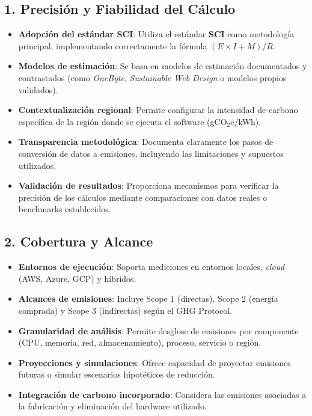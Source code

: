 \documentclass[12pt,a4paper]{report}
\begin{document}
\subsection*{1. Precisión y Fiabilidad del Cálculo}
\begin{itemize}
  \item \textbf{Adopción del estándar SCI}: Utiliza el estándar \textbf{SCI} como metodología principal, implementando correctamente la fórmula $(E \times I + M)/R$.
  \item \textbf{Modelos de estimación}: Se basa en modelos de estimación documentados y contrastados (como \textit{OneByte}, \textit{Sustainable Web Design} o modelos propios validados).
  \item \textbf{Contextualización regional}: Permite configurar la intensidad de carbono específica de la región donde se ejecuta el software (gCO$_2$e/kWh).
  \item \textbf{Transparencia metodológica}: Documenta claramente los pasos de conversión de datos a emisiones, incluyendo las limitaciones y supuestos utilizados.
  \item \textbf{Validación de resultados}: Proporciona mecanismos para verificar la precisión de los cálculos mediante comparaciones con datos reales o benchmarks establecidos.
\end{itemize}

\subsection*{2. Cobertura y Alcance}
\begin{itemize}
  \item \textbf{Entornos de ejecución}: Soporta mediciones en entornos locales, \textit{cloud} (AWS, Azure, GCP) y híbridos.
  \item \textbf{Alcances de emisiones}: Incluye Scope 1 (directas), Scope 2 (energía comprada) y Scope 3 (indirectas) según el GHG Protocol.
  \item \textbf{Granularidad de análisis}: Permite desglose de emisiones por componente (CPU, memoria, red, almacenamiento), proceso, servicio o región.
  \item \textbf{Proyecciones y simulaciones}: Ofrece capacidad de proyectar emisiones futuras o simular escenarios hipotéticos de reducción.
  \item \textbf{Integración de carbono incorporado}: Considera las emisiones asociadas a la fabricación y eliminación del hardware utilizado.
\end{itemize}
\end{document}
